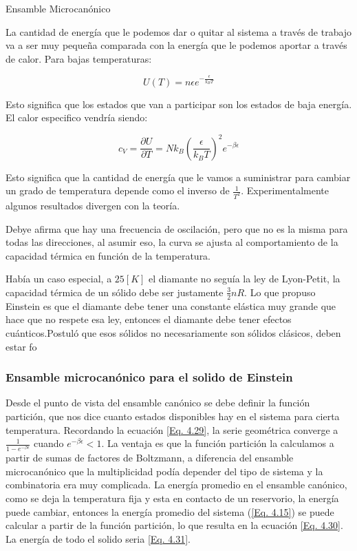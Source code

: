 \documentclass[11pt,fleqn]{book}
\begin{document}
\begin{remark}{Ensamble Microcanónico}

La cantidad de energía que le podemos dar o quitar al sistema a través de trabajo va a ser muy pequeña comparada con la energía que le podemos aportar a través de calor. Para bajas temperaturas:

\begin{equation*}
    U(T)=n\epsilon e^{-\frac{\epsilon}{k_{B}T}}
\end{equation*}

Esto significa que los estados que van a participar son los estados de baja energía. El calor especifico vendría siendo:

\begin{equation*}
    c_{V}=\frac{\partial U}{\partial T}=Nk_{B}\left(\frac{\epsilon}{k_{B}T}\right)^{2}e^{-\beta\epsilon}
\end{equation*}

Esto significa que la cantidad de energía que le vamos a suministrar para cambiar un grado de temperatura depende como el inverso de $\frac{1}{T^{2}}$. Experimentalmente algunos resultados divergen con la teoría.


Debye afirma que hay una frecuencia de oscilación, pero que no es la misma para todas las direcciones, al asumir eso, la curva se ajusta al comportamiento de la capacidad térmica en función de la temperatura. 
\end{remark}   

Había un caso especial, a $25 [K]$ el diamante no seguía la ley de Lyon-Petit, la capacidad térmica de un sólido debe ser justamente $\frac{3}{2}nR$. Lo que propuso Einstein es que el diamante debe tener una constante elástica muy grande que hace que no respete esa ley, entonces el diamante debe tener efectos cuánticos.Postuló que esos sólidos no necesariamente son sólidos clásicos, deben estar fo

\subsubsection{Ensamble microcanónico para el solido de Einstein}

Desde el punto de vista del ensamble canónico se debe definir la función partición, que nos dice cuanto estados disponibles hay en el sistema para cierta temperatura. Recordando la ecuación \ref{Eq. 4.29}, la serie geométrica converge a $\frac{1}{1-e^{-\beta\epsilon}}$ cuando $e^{-\beta\epsilon}<1$.  La ventaja es que la función partición la calculamos a partir de sumas de factores de Boltzmann, a diferencia del ensamble microcanónico que la multiplicidad podía depender del tipo de sistema y la combinatoria era muy complicada. La energía promedio en el ensamble canónico, como se deja la temperatura fija y esta en contacto de un reservorio, la energía puede cambiar, entonces la energía promedio del sistema (\ref{Eq. 4.15}) se puede calcular a partir de la función partición, lo que resulta en la ecuación \ref{Eq. 4.30}. La energía de todo el solido seria \ref{Eq. 4.31}.
\end{document}
